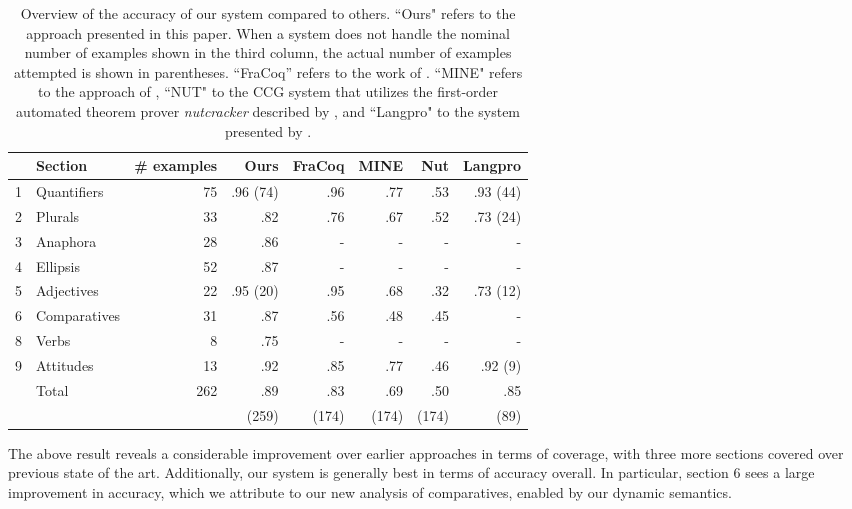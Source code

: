 \documentclass{article}
\begin{document}
\providecommand\forcecenter{\multicolumn{1}{c}}
\begin{table}
  \centering
\begin{tabular}{rlrrrrrr}
  & Section      & \# examples & Ours     & FraCoq & MINE & Nut  & Langpro  \\ \hline
1 & Quantifiers  & 75          & .96 (74) & .96    & .77  & .53  & .93 (44) \\
2 & Plurals      & 33          & .82      & .76    & .67  & .52  & .73 (24) \\
3 & Anaphora     & 28          & .86      &   -    & -    & -    &  -       \\
4 & Ellipsis     & 52          & .87      &   -    & -    & -    &  -       \\
5 & Adjectives   & 22          & .95 (20) & .95    & .68  & .32  & .73 (12) \\
6 & Comparatives & 31          & .87      & .56    & .48  & .45  &  -       \\
8 & Verbs        & 8           & .75      &   -    & -    & -    &  -       \\
9 & Attitudes    & 13          & .92      & .85    & .77  & .46  & .92 (9)  \\ \hline
  & Total        & 262         & .89      & .83    & .69  & .50  & .85  \\
  &              &             & (259)    & (174)  & (174)& (174)& (89)
  \end{tabular}
  \caption{Overview of the accuracy of our system compared to others.
    ``Ours" refers to the approach presented in this paper. When a
    system does not handle the nominal number of examples shown in the
    third column, the actual number of examples attempted is shown in
    parentheses.  ``FraCoq'' refers to the work of
    \citet{bernardy_type_2017}. ``MINE" refers to the approach of
    \citet{Mineshima:2015}, ``NUT" to the CCG system that utilizes the
    first-order automated theorem prover \textit{nutcracker} described
    by \citet{bos:2008}, and ``Langpro" to the system presented by
    \citet{Abzianidze:2015}.  }
\end{table}


The above result reveals a considerable improvement over earlier
approaches in terms of coverage, with three more sections covered over
previous state of the art. Additionally, our system is generally best
in terms of accuracy overall. In particular, section 6 sees a large
improvement in accuracy, which we attribute to our new analysis of
comparatives, enabled by our dynamic semantics.
\end{document}
